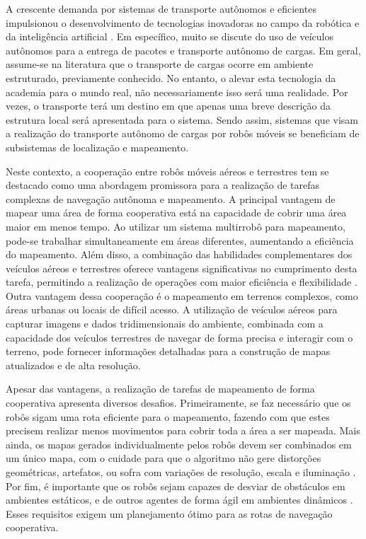 %
%
\vspace{-42pt}

A crescente demanda por sistemas de transporte autônomos e eficientes impulsionou o desenvolvimento de tecnologias inovadoras no campo da robótica e da inteligência artificial \cite{Chen2023MilestonesSurveys} \cite{Teng2023MotionPerspectives}. Em específico, muito se discute do uso de veículos autônomos para a entrega de pacotes e transporte autônomo de cargas. \cite{Bacheti2022Leader-FollowerDelivery} \cite{Vale2021VeiculoIndustrial} \cite{Bacheti2021ALast-Mile-Delivery}
Em geral, assume-se na literatura que o transporte de cargas ocorre em ambiente estruturado, previamente conhecido. No entanto, o alevar esta tecnologia da academia para o mundo real, não necessariamente isso será uma realidade. Por vezes, o transporte terá um destino em que apenas uma breve descrição da estrutura local será apresentada para o sistema. Sendo assim, sistemas que visam a realização do transporte autônomo de cargas por robôs móveis se beneficiam de subsistemas de localização e mapeamento.\cite{Cadena2016PastAge}

Neste contexto, a cooperação entre robôs móveis aéreos e terrestres tem se destacado como uma abordagem promissora para a realização de tarefas complexas de navegação autônoma e mapeamento. A principal vantagem de mapear uma área de forma cooperativa está na capacidade de cobrir uma área maior em menos tempo. Ao utilizar um sistema multirrobô para mapeamento, pode-se trabalhar simultaneamente em áreas diferentes, aumentando a eficiência do mapeamento\cite{Feng2020AnSystems}. Além disso, a combinação das habilidades complementares dos veículos aéreos e terrestres oferece vantagens significativas no cumprimento desta tarefa, permitindo a realização de operações com maior eficiência e flexibilidade \cite{Bacheti2022Leader-FollowerDelivery}. Outra vantagem dessa cooperação é o mapeamento em terrenos complexos, como áreas urbanas ou locais de difícil acesso. A utilização de veículos aéreos para capturar imagens e dados tridimensionais do ambiente, combinada com a capacidade dos veículos terrestres de navegar de forma precisa e interagir com o terreno, pode fornecer informações detalhadas para a construção de mapas atualizados e de alta resolução.

Apesar das vantagens, a realização de tarefas de mapeamento de forma cooperativa apresenta diversos desafios. Primeiramente, se faz necessário que os robôs sigam uma rota eficiente para o mapeamento, fazendo com que estes precisem realizar menos movimentos para cobrir toda a área a ser mapeada.  Mais ainda, os mapas gerados individualmente pelos robôs devem ser combinados em um único mapa, com o cuidade para que o algoritmo não gere distorções geométricas, artefatos, ou sofra com variações de resolução, escala e iluminação \cite{Bavle2023FromSurvey}\cite{AbaspurKazerouni2022ASLAM}. Por fim, é importante que os robôs sejam capazes de desviar de obstáculos em ambientes estáticos, e de outros agentes de forma ágil em ambientes dinâmicos \cite{Li2022VisualDetection}. Esses requisitos exigem um planejamento ótimo para as rotas de navegação cooperativa\cite{Vasconcelos2020Real-timeMissions}.


